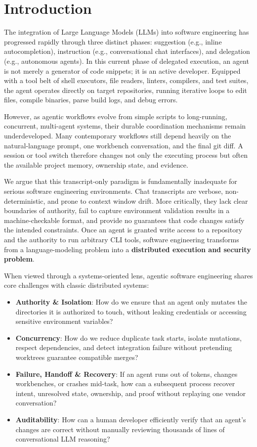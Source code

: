 \section{Introduction}
\label{sec:intro}

The integration of Large Language Models (LLMs) into software engineering has progressed rapidly through three distinct phases: suggestion (e.g., inline autocompletion), instruction (e.g., conversational chat interfaces), and delegation (e.g., autonomous agents). In this current phase of delegated execution, an agent is not merely a generator of code snippets; it is an active developer. Equipped with a tool belt of shell executors, file readers, linters, compilers, and test suites, the agent operates directly on target repositories, running iterative loops to edit files, compile binaries, parse build logs, and debug errors.

However, as agentic workflows evolve from simple scripts to long-running, concurrent, multi-agent systems, their durable coordination mechanisms remain underdeveloped. Many contemporary workflows still depend heavily on the natural-language prompt, one workbench conversation, and the final git diff. A session or tool switch therefore changes not only the executing process but often the available project memory, ownership state, and evidence.

We argue that this transcript-only paradigm is fundamentally inadequate for serious software engineering environments. Chat transcripts are verbose, non-deterministic, and prone to context window drift. More critically, they lack clear boundaries of authority, fail to capture environment validation results in a machine-checkable format, and provide no guarantees that code changes satisfy the intended constraints. Once an agent is granted write access to a repository and the authority to run arbitrary CLI tools, software engineering transforms from a language-modeling problem into a \textbf{distributed execution and security problem}.

When viewed through a systems-oriented lens, agentic software engineering shares core challenges with classic distributed systems:
\begin{itemize}
    \item \textbf{Authority \& Isolation}: How do we ensure that an agent only mutates the directories it is authorized to touch, without leaking credentials or accessing sensitive environment variables?
    \item \textbf{Concurrency}: How do we reduce duplicate task starts, isolate mutations, respect dependencies, and detect integration failure without pretending worktrees guarantee compatible merges?
    \item \textbf{Failure, Handoff \& Recovery}: If an agent runs out of tokens, changes workbenches, or crashes mid-task, how can a subsequent process recover intent, unresolved state, ownership, and proof without replaying one vendor conversation?
    \item \textbf{Auditability}: How can a human developer efficiently verify that an agent's changes are correct without manually reviewing thousands of lines of conversational LLM reasoning?
\end{itemize}

